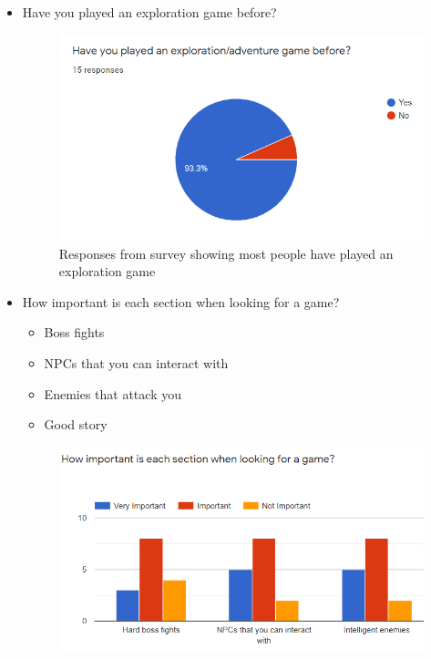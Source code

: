 \documentclass[../Main.tex]{subfiles}
\begin{document}
            \begin{itemize}
                \item Have you played an exploration game before?
                \begin{figure}[hbt!]
                    \centerline{\includegraphics[scale=1]{img/Survey/Played Exploration Game.PNG}}
                    \caption{Responses from survey showing most people have played an exploration game}
                    \label{fig}
                \end{figure}
                \clearpage
                \item How important is each section when looking for a game?
                \begin{itemize}
                    \item Boss fights
                    \item NPCs that you can interact with
                    \item Enemies that attack you
                    \item Good story
                \end{itemize}
                \begin{figure}[hbt!]
                    \centerline{\includegraphics[scale=1]{img/Survey/Importance of games.PNG}}

\end{figure}
\end{itemize}
\end{document}
